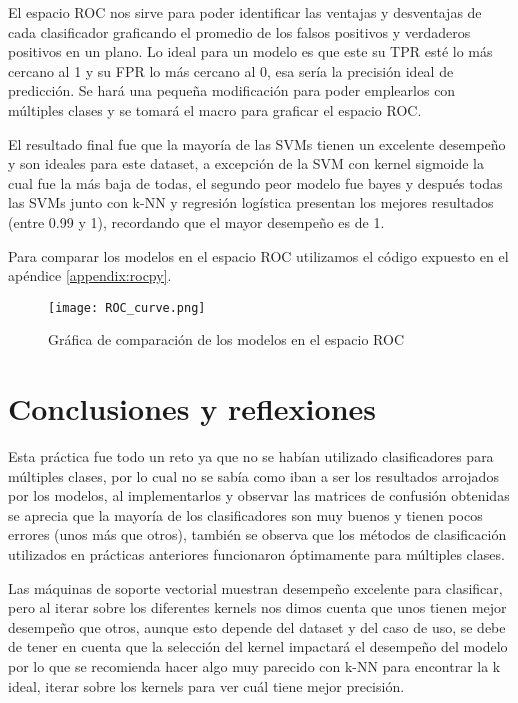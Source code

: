 \documentclass[sigconf,authorversion,nonacm]{acmart}
\begin{document}
El espacio ROC nos sirve para poder identificar las ventajas y desventajas de cada clasificador graficando el promedio de los falsos positivos y verdaderos positivos en un plano. Lo ideal para un modelo es que este su TPR esté lo más cercano al 1 y su FPR lo más cercano al 0, esa sería la precisión ideal de predicción. Se hará una pequeña modificación para poder emplearlos con múltiples clases y se tomará el macro para graficar el espacio ROC.

El resultado final fue que la mayoría de las SVMs tienen un excelente desempeño y son ideales para este dataset, a excepción de la SVM con kernel sigmoide la cual fue la más baja de todas, el segundo peor modelo fue bayes y después todas las SVMs junto con k-NN y regresión logística presentan los mejores resultados (entre 0.99 y 1), recordando que el mayor desempeño es de 1.

Para comparar los modelos en el espacio ROC utilizamos el código expuesto en el apéndice \ref{appendix:rocpy}.

\vfill
\pagebreak

\begin{figure}[H]
  \centering
  \texttt{[image: ROC\_curve.png]}
  \caption{Gráfica de comparación de los modelos en el espacio ROC}
\end{figure}

\section{Conclusiones y reflexiones}
Esta práctica fue todo un reto ya que no se habían utilizado clasificadores para múltiples clases, por lo cual no se sabía como iban a ser los resultados arrojados por los modelos, al implementarlos y observar las matrices de confusión obtenidas se aprecia que la mayoría de los clasificadores son muy buenos y tienen pocos errores (unos más que otros), también se observa que los métodos de clasificación utilizados en prácticas anteriores funcionaron óptimamente para múltiples clases.

Las máquinas de soporte vectorial muestran desempeño excelente para clasificar, pero al iterar sobre los diferentes kernels nos dimos cuenta que unos tienen mejor desempeño que otros, aunque esto depende del dataset y del caso de uso, se debe de tener en cuenta que la selección del kernel impactará el desempeño del modelo por lo que se recomienda hacer algo muy parecido con k-NN para encontrar la k ideal, iterar sobre los kernels para ver cuál tiene mejor precisión.
\end{document}
